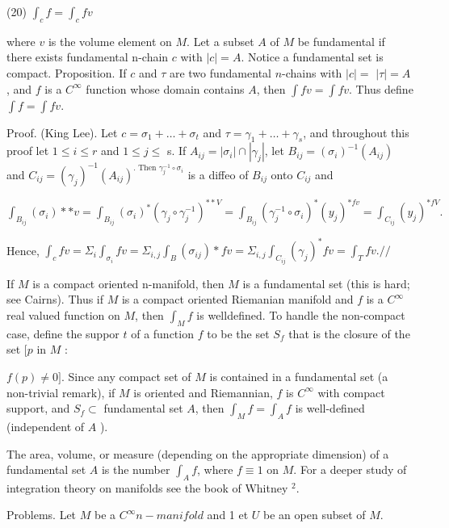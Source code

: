 \documentclass[10pt]{article}
\begin{document}
(20) $\int_{c} f=\int_{c} f v$

where $v$ is the volume element on $M$. Let a subset $A$ of $M$ be fundamental if there exists fundamental n-chain $c$ with $|c|=A$. Notice a fundamental set is compact. Proposition. If $c$ and $\tau$ are two fundamental $n$-chains with $|c|=$ $|\tau|=A$, and $f$ is a $C^{\infty}$ function whose domain contains $A$, then $\int f v=\int f v$. Thus define $\int f=\int f v$.

Proof. (King Lee). Let $c=\sigma_{1}+\ldots+\sigma_{t}$ and $\tau=\gamma_{1}+\ldots+\gamma_{s}$, and throughout this proof let $1 \leq i \leq r$ and $1 \leq j \leq$ s. If $A_{i j}=\left|\sigma_{i}\right| \cap\left|\gamma_{j}\right|$, let $B_{i j}=\left(\sigma_{i}\right)^{-1}\left(A_{i j}\right)$ and $C_{i j}=\left(\gamma_{j}\right)^{-1}\left(A_{i j}\right)^{\text {. Then } \gamma_{j}^{-1} \circ \sigma_{i}}$ is a diffeo of $B_{i j}$ onto $C_{i j}$ and

$\int_{B_{i j}}\left(\sigma_{i}\right) * * v=\int_{B_{i j}}\left(\sigma_{i}\right)^{*}\left(\gamma_{j} \circ \gamma_{j}^{-1}\right)^{* * V}=\int_{B_{i j}}\left(\gamma_{j}^{-1} \circ \sigma_{i}\right)^{*}\left(y_{j}\right)^{* f v}=\int_{C_{i j}}\left(y_{j}\right)^{* f V} .$

Hence, $\int_{c} f v=\Sigma_{i} \int_{\sigma_{i}} f v=\Sigma_{i, j} \int_{B}\left(\sigma_{i j}\right) * f v=\Sigma_{i, j} \int_{C_{i j}}\left(\gamma_{j}\right)^{*} f v=\int_{T} f v . / /$

If $M$ is a compact oriented n-manifold, then $M$ is a fundamental set (this is hard; see Cairns). Thus if $M$ is a compact oriented Riemanian manifold and $f$ is a $C^{\infty}$ real valued function on $M$, then $\int_{M} f$ is welldefined. To handle the non-compact case, define the suppor $t$ of a function $f$ to be the set $S_{f}$ that is the closure of the set $[p$ in $M$ :

$f(p) \neq 0]$. Since any compact set of $M$ is contained in a fundamental set (a non-trivial remark), if $M$ is oriented and Riemannian, $f$ is $C^{\infty}$ with compact support, and $S_{f} \subset$ fundamental set $A$, then $\int_{M} f=\int_{A} f$ is well-defined (independent of $A$ ).

The area, volume, or measure (depending on the appropriate dimension) of a fundamental set $A$ is the number $\int_{A} f$, where $f \equiv 1$ on $M$. For a deeper study of integration theory on manifolds see the book of Whitney ${ }^{2}$.

Problems. Let $M$ be a $C^{\infty} n-m a n i f o l d$ and 1 et $U$ be an open subset of $M$.
\end{document}
